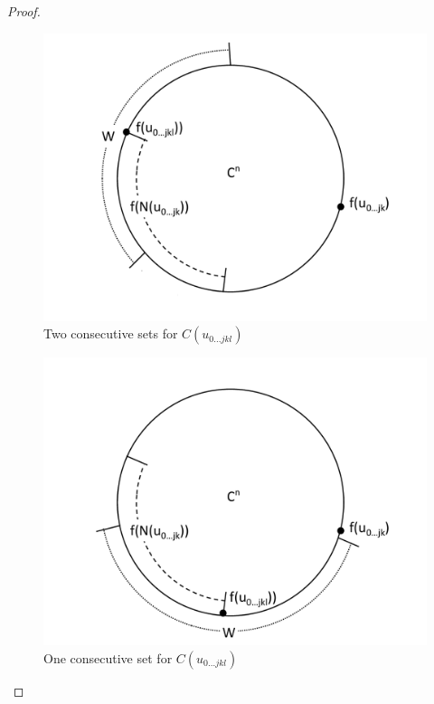 \begin{proof}
\begin{figure}
 \centering
     \vspace{-0pt}
    \includegraphics[scale=0.45]{../figures/fig4-5-a.pdf}
   \vspace{-0pt}
\caption{Two consecutive sets for $C(u_{0\dots jkl})$} 
\label{lemma ex 1}
\end{figure}

\begin{figure}
 \centering
     \vspace{-0pt}
    \includegraphics[scale=0.45]{../figures/fig4-5-b.pdf}
   \vspace{-0pt}
\caption{One consecutive set for $C(u_{0\dots jkl})$} 
\label{lemma ex 11}
\end{figure}
 


\end{proof}
